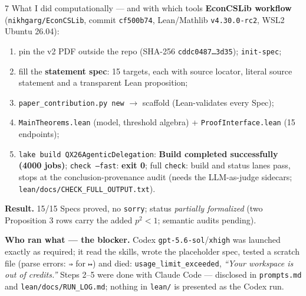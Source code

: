 \documentclass[aspectratio=169,11pt]{beamer}
\begin{document}
\begin{frame}{7 \textperiodcentered{} What I did computationally --- and with which tools}
  \footnotesize
  \textbf{EconCSLib workflow} (\texttt{nikhgarg/EconCSLib}, commit \texttt{cf500b74}, Lean/Mathlib \texttt{v4.30.0-rc2}, WSL2 Ubuntu 26.04):
  \begin{enumerate}
    \item pin the v2 PDF outside the repo (SHA-256 \texttt{cddc0487\ldots3d35}); \texttt{init-spec};
    \item fill the \textbf{statement spec}: 15 targets, each with source locator, literal source
      statement and a transparent Lean proposition;
    \item \texttt{paper\_contribution.py new} $\to$ scaffold (Lean-validates every Spec);
    \item \texttt{MainTheorems.lean} (model, threshold algebra) + \texttt{ProofInterface.lean} (15 endpoints);
    \item \texttt{lake build QX26AgenticDelegation}: \textbf{Build completed successfully (4000 jobs)};
      \texttt{check --fast}: \textbf{exit 0}; full \texttt{check}: build and status lanes pass, stops at the
      conclusion-provenance audit (needs the LLM-as-judge sidecars; \texttt{lean/docs/CHECK\_FULL\_OUTPUT.txt}).
  \end{enumerate}
  \textbf{Result.} 15/15 Specs proved, no \texttt{sorry}; status \emph{partially formalized}
  (two Proposition 3 rows carry the added $p^2<1$; semantic audits pending).

  \smallskip
  \textbf{Who ran what --- the blocker.} Codex \texttt{gpt-5.6-sol}/\texttt{xhigh} was launched exactly as
  required; it read the skills, wrote the placeholder spec, tested a scratch file (parse errors:
  \texttt{⇒} for \texttt{↦}) and died: \texttt{usage\_limit\_exceeded}, \emph{``Your workspace is out of
  credits.''} Steps 2--5 were done with Claude Code --- disclosed in \texttt{prompts.md} and
  \texttt{lean/docs/RUN\_LOG.md}; nothing in \texttt{lean/} is presented as the Codex run.
\end{frame}
\end{document}
